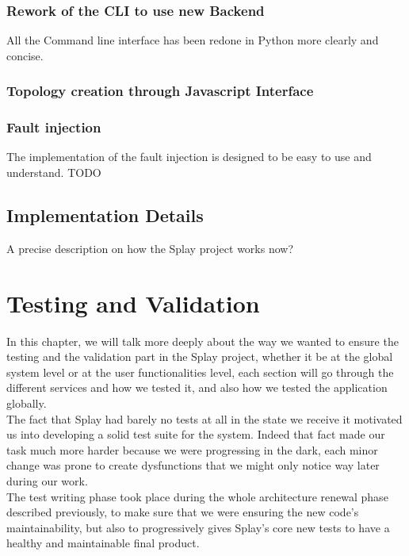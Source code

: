 \documentclass{eplmastersthesis}
\begin{document}


      \subsection{Rework of the CLI to use new Backend}

        All the Command line interface has been redone in Python more clearly and concise.

      \subsection{Topology creation through Javascript Interface}

      \subsection{Fault injection}

        The implementation of the fault injection is designed to be easy to use and understand. TODO


    \section{Implementation Details}

      A precise description on how the Splay project works now?


  \chapter{Testing and Validation}

    In this chapter, we will talk more deeply about the way we wanted to ensure
    the testing and the validation part in the Splay project, whether it be
    at the global system level or at the user functionalities level, each
    section will go through the different services and how we tested it, and
    also how we tested the application globally.\\

    The fact that Splay had barely no tests at all in the state we receive it
    motivated us into developing a solid test suite for the system.
    Indeed that fact made our task much more harder because we were progressing
    in the dark, each minor change was prone to create dysfunctions that we
    might only notice way later during our work.\\

    The test writing phase took place during the whole architecture renewal
    phase described previously, to make sure that we were ensuring the new
    code's maintainability, but also to progressively gives Splay's core
    new tests to have a healthy and maintainable final product.
\end{document}
